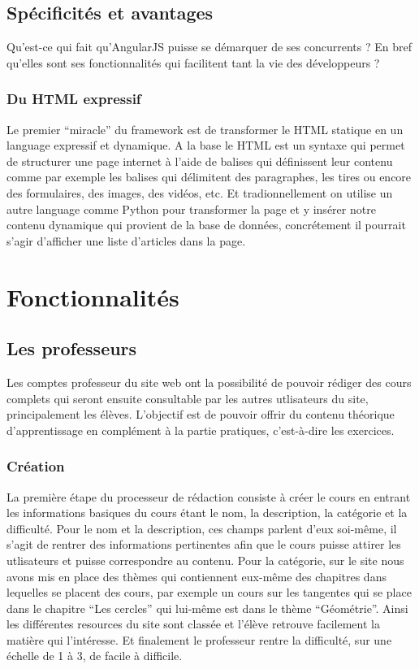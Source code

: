 \documentclass[letterpaper,10pt,english]{sphinxmanual}
\begin{document}
\section{Spécificités et avantages}
\label{angularjs:specificites-et-avantages}
Qu'est-ce qui fait qu'AngularJS puisse se démarquer de ses concurrents ? En bref qu'elles sont ses fonctionnalités qui facilitent tant la vie des développeurs ?


\subsection{Du HTML expressif}
\label{angularjs:du-html-expressif}
Le premier ``miracle'' du framework est de transformer le HTML statique en un language expressif et dynamique. A la base le HTML est un syntaxe qui permet de structurer une page internet à l'aide de balises qui définissent leur contenu comme par exemple les balises qui délimitent des paragraphes, les tires ou encore des formulaires, des images, des vidéos, etc. Et tradionnellement on utilise un autre language comme Python pour transformer la page et y insérer notre contenu dynamique qui provient de la base de données, concrétement il pourrait s'agir d'afficher une liste d'articles dans la page.


\chapter{Fonctionnalités}
\label{functionalities::doc}\label{functionalities:fonctionnalites}

\section{Les professeurs}
\label{functionalities:les-professeurs}
Les comptes professeur du site web ont la possibilité de pouvoir rédiger des cours complets qui seront ensuite consultable par les autres utlisateurs du site, principalement les élèves. L'objectif est de pouvoir offrir du contenu théorique d'apprentissage en complément à la partie pratiques, c'est-à-dire les exercices.


\subsection{Création}
\label{functionalities:creation}
La première étape du processeur de rédaction consiste à créer le cours en entrant les informations basiques du cours étant le nom, la description, la catégorie et la difficulté. Pour le nom et la description, ces champs parlent d'eux soi-même, il s'agit de rentrer des informations pertinentes afin que le cours puisse attirer les utlisateurs et puisse correspondre au contenu. Pour la catégorie, sur le site nous avons mis en place des thèmes qui contiennent eux-même des chapitres dans lequelles se placent des cours, par exemple un cours sur les tangentes qui se place dans le chapitre ``Les cercles'' qui lui-même est dans le thème ``Géométrie''. Ainsi les différentes resources du site sont classée et l'élève retrouve facilement la matière qui l'intéresse. Et finalement le professeur rentre la difficulté, sur une échelle de 1 à 3, de facile à difficile.
\end{document}
